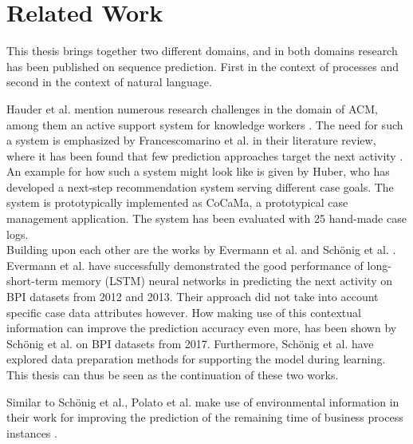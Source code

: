 \chapter{Related Work}\label{sec:related-work}
This thesis brings together two different domains, and in both domains research has been published on sequence prediction. First in the context of processes and second in the context of natural language.

Hauder et al. mention numerous research challenges in the domain of ACM, among them an active support system for knowledge workers \cite{hauder2014}.
The need for such a system is emphasized by Francescomarino et al. in their literature review, where it has been found that few prediction approaches target the next activity \cite{francescomarino2018}.\\

An example for how such a system might look like is given by Huber, who has developed a next-step recommendation system serving different case goals.
The system is prototypically implemented as CoCaMa, a prototypical case management application. The system has been evaluated with 25 hand-made case logs.\\

Building upon each other are the works by Evermann et al. \cite{evermann2016} and Schönig et al. \cite{schoenig2018}. Evermann et al. have successfully demonstrated the good performance of long-short-term memory (LSTM) neural networks in predicting the next activity on BPI datasets from 2012 and 2013. Their approach did not take into account specific case data attributes however. How making use of this contextual information can improve the prediction accuracy even more, has been shown by Schönig et al. \cite{schoenig2018} on BPI datasets from 2017. Furthermore, Schönig et al. have explored data preparation methods for supporting the model during learning.
This thesis can thus be seen as the continuation of these two works.

Similar to Schönig et al., Polato et al. make use of environmental information in their work for improving the prediction of the remaining time of business process instances \cite{polato2014}.\\

